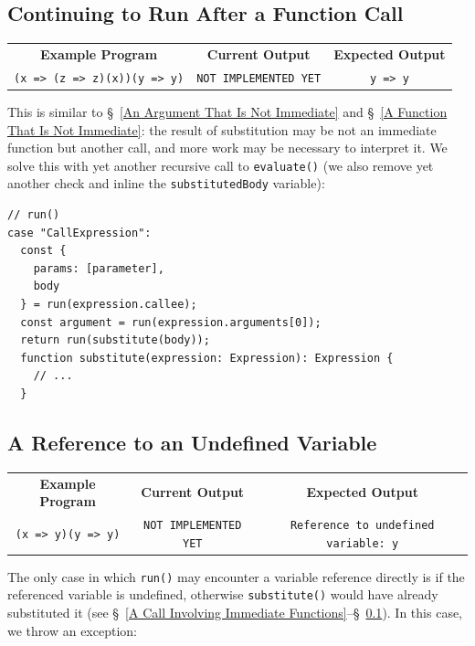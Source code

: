 \documentclass[12pt, oneside]{book}
\begin{document}
\subsection{Continuing to Run After a Function Call}
\label{Continuing to Run After a Function Call}

\begin{center}
\begin{tabular}{c|c|c}
\textbf{Example Program} & \textbf{Current Output} & \textbf{Expected Output} \\
\texttt{(x => (z => z)(x))(y => y)} & \texttt{NOT IMPLEMENTED YET} & \texttt{y => y} \\
\end{tabular}
\end{center}

This is similar to §~\ref{An Argument That Is Not Immediate} and §~\ref{A Function That Is Not Immediate}: the result of substitution may be not an immediate function but another call, and more work may be necessary to interpret it. We solve this with yet another recursive call to \texttt{evaluate()} (we also remove yet another check and inline the \texttt{substitutedBody} variable):

\begin{verbatim}
// run()
case "CallExpression":
  const {
    params: [parameter],
    body
  } = run(expression.callee);
  const argument = run(expression.arguments[0]);
  return run(substitute(body));
  function substitute(expression: Expression): Expression {
    // ...
  }
\end{verbatim}

\subsection{A Reference to an Undefined Variable}

\begin{center}
\begin{tabular}{c|c|c}
\textbf{Example Program} & \textbf{Current Output} & \textbf{Expected Output} \\
\texttt{(x => y)(y => y)} & \texttt{NOT IMPLEMENTED YET} & \texttt{Reference to undefined variable: y} \\
\end{tabular}
\end{center}

The only case in which \texttt{run()} may encounter a variable reference directly is if the referenced variable is undefined, otherwise \texttt{substitute()} would have already substituted it (see §~\ref{A Call Involving Immediate Functions}–§~\ref{Continuing to Run After a Function Call}). In this case, we throw an exception:
\end{document}
